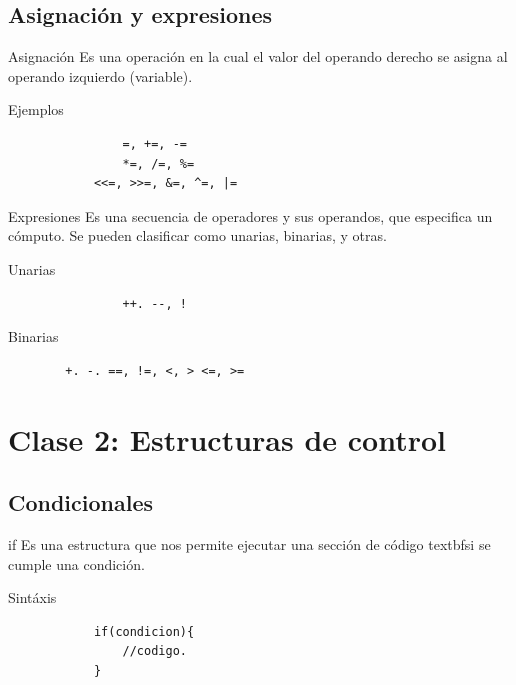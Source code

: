 \documentclass[handout, 14pt]{beamer}
\begin{document}
\subsection{Asignación y expresiones}
\begin{frame}[fragile]{Asignación}
    Es una operación en la cual el valor del operando derecho
    se asigna al operando izquierdo (variable).\cite{microsoft_asignacion}
    \begin{exampleblock}{Ejemplos}
        \begin{verbatim}
                =, +=, -=
                *=, /=, %=
            <<=, >>=, &=, ^=, |=
        \end{verbatim}
    \end{exampleblock}
\end{frame}

\begin{frame}[fragile]{Expresiones}
    Es una secuencia de operadores y sus operandos, que especifica un cómputo.\cite{cpp_expressions}
    Se pueden clasificar como unarias, binarias, y otras.
    \begin{block}{Unarias}
        \begin{verbatim}
                ++. --, !
        \end{verbatim}
    \end{block}
    \begin{block}{Binarias}
        \begin{verbatim}
        +. -. ==, !=, <, > <=, >=
        \end{verbatim}
    \end{block}
\end{frame}

\section{Clase 2: Estructuras de control}
\subsection{Condicionales}
\begin{frame}[fragile]{if}
    Es una estructura que nos permite ejecutar una sección de código textbf{si} se cumple una condición.
    \begin{block}{Sintáxis}
        \begin{verbatim}
            if(condicion){
                //codigo.
            }
        \end{verbatim}
    \end{block}
\end{frame}
\end{document}

